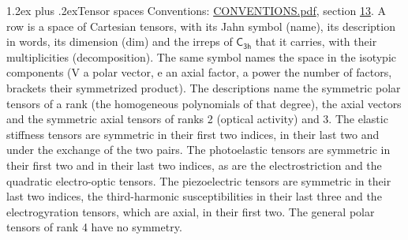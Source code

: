 \documentclass[10pt,a4paper]{article}
\makeatletter
\renewcommand\section{\@startsection{section}{1}{\z@}{-3ex plus -1ex minus -.2ex}%
  {1.2ex plus .2ex}{\normalfont\large\sffamily\bfseries\color{parttitle}}}
\numberwithin{equation}{section}
\newcommand{\grp}[1]{\mathsf{#1}}
\makeatother
\begin{document}
\section{Tensor spaces}\label{s:tensor_spaces}
Conventions: \href{../../CONVENTIONS.pdf}{CONVENTIONS.pdf}, section \href{../../CONVENTIONS.pdf\#conv.13}{13}.
\leavevmode\label{n:head.name}\label{n:head.description}\label{n:head.dim}\label{n:head.decomposition}A row is a space of Cartesian tensors, with its Jahn symbol (name), its description in words, its dimension (dim) and the irreps of $\grp{C_{3h}}$ that it carries, with their multiplicities (decomposition). \label{n:label.jahn}The same symbol names the space in the isotypic components (V a polar vector, e an axial factor, a power the number of factors, brackets their symmetrized product). The descriptions name the symmetric polar tensors of a rank (the homogeneous polynomials of that degree), the axial vectors and the symmetric axial tensors of ranks 2 (optical activity) and 3. The elastic stiffness tensors are symmetric in their first two indices, in their last two and under the exchange of the two pairs. The photoelastic tensors are symmetric in their first two and in their last two indices, as are the electrostriction and the quadratic electro-optic tensors. The piezoelectric tensors are symmetric in their last two indices, the third-harmonic susceptibilities in their last three and the electrogyration tensors, which are axial, in their first two. The general polar tensors of rank 4 have no symmetry.
\end{document}
